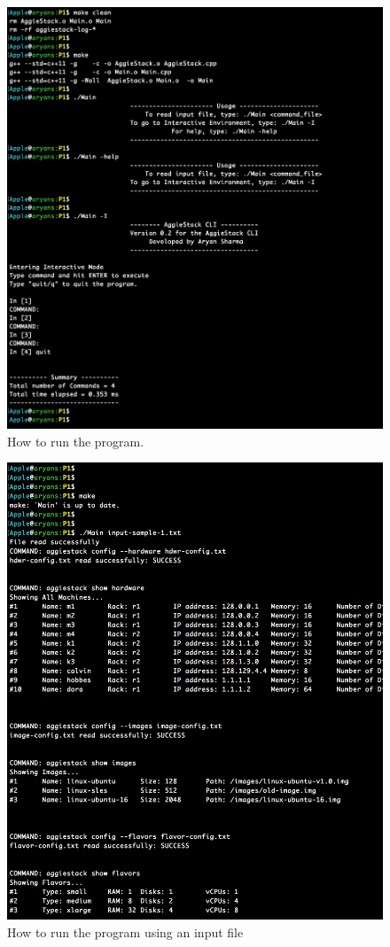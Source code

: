 \documentclass[letterpaper]{article}
\begin{document}
\begin{figure} [H]
	\centering
	\includegraphics[width=1\textwidth]{cli1.png}
	\caption{\label{fig:data}How to run the program.}
\end{figure}

\begin{figure} [H]
	\centering
	\includegraphics[width=1\textwidth]{cli2.png}
	\caption{\label{fig:data}How to run the program using an input file}
\end{figure}
\end{document}
